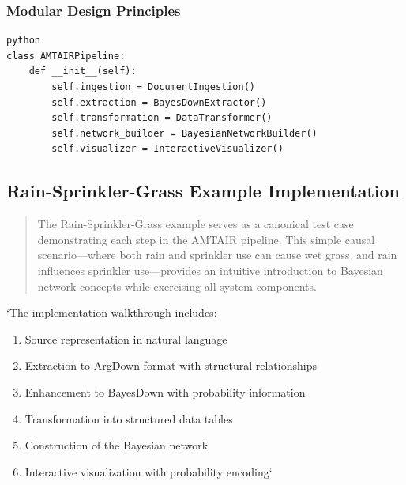 \documentclass[
  11pt,
  letterpaper,
]{book}
\providecommand{\tightlist}{%
  \setlength{\itemsep}{0pt}\setlength{\parskip}{0pt}}
\begin{document}
\subsubsection{Modular Design Principles}\label{sec-modular-design}

\begin{verbatim}
python
class AMTAIRPipeline:
    def __init__(self):
        self.ingestion = DocumentIngestion()
        self.extraction = BayesDownExtractor() 
        self.transformation = DataTransformer()
        self.network_builder = BayesianNetworkBuilder()
        self.visualizer = InteractiveVisualizer()
\end{verbatim}

\subsection{Rain-Sprinkler-Grass Example
Implementation}\label{sec-rain-sprinkler-grass}

\begin{quote}
The Rain-Sprinkler-Grass example serves as a canonical test case
demonstrating each step in the AMTAIR pipeline. This simple causal
scenario---where both rain and sprinkler use can cause wet grass, and
rain influences sprinkler use---provides an intuitive introduction to
Bayesian network concepts while exercising all system components.
\end{quote}

`The implementation walkthrough includes:

\begin{enumerate}
\def\labelenumi{\arabic{enumi}.}
\tightlist
\item
  Source representation in natural language
\item
  Extraction to ArgDown format with structural relationships
\item
  Enhancement to BayesDown with probability information
\item
  Transformation into structured data tables
\item
  Construction of the Bayesian network
\item
  Interactive visualization with probability encoding`
\end{enumerate}
\end{document}
